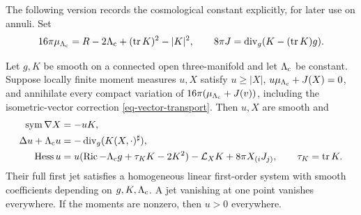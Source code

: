 The following version records the cosmological constant explicitly,
for later use on annuli.  Set
\[
 16\pi\mu_{\Lambda_{\rm c}}
    =R-2\Lambda_{\rm c}+(\operatorname{tr} K)^2-|K|^2,\qquad
 8\pi J=\operatorname{div}_g(K-(\operatorname{tr} K)g).
\]

\begin{lemma}
\label{eq-local-adjoint}
Let \(g,K\) be smooth on a connected open three-manifold and let
\(\Lambda_{\rm c}\) be constant.  Suppose locally finite moment
measures \(u,X\) satisfy \(u\geq|X|\),
\(u\mu_{\Lambda_{\rm c}}+J(X)=0\), and annihilate every compact
variation of \(16\pi(\mu_{\Lambda_{\rm c}}+J(v))\), including the
isometric-vector correction \eqref{eq-vector-transport}.
Then \(u,X\) are smooth and
\begin{align}
 \operatorname{sym}\nabla X&=-uK,\label{eq-general-shift}\\
 \Delta u+\Lambda_{\rm c}u
   &=-\operatorname{div}_g(K(X,\cdot)^\sharp),\label{eq-general-lapse}\\
 \operatorname{Hess} u
   &=u(\operatorname{Ric}-\Lambda_{\rm c}g+\tau_KK-2K^2)
       -\mathcal L_XK+8\pi X_{(i}J_{j)},\qquad \tau_K=\operatorname{tr} K.
       \label{eq-general-full-lapse}
\end{align}
Their full first jet satisfies a homogeneous linear first-order
system with smooth coefficients depending on \(g,K,\Lambda_{\rm c}\).
A jet vanishing at one point vanishes everywhere.  If the moments
are nonzero, then \(u>0\) everywhere.
\end{lemma}


